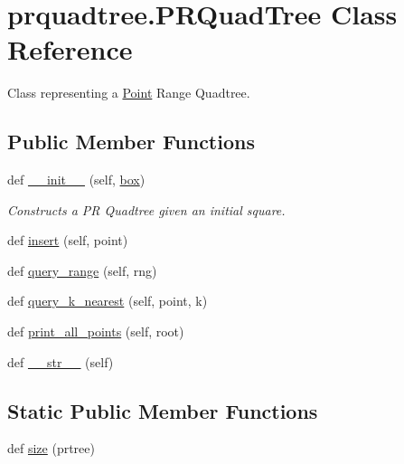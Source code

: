 \section{prquadtree.\+P\+R\+Quad\+Tree Class Reference}
\label{classprquadtree_1_1PRQuadTree}


Class representing a \hyperlink{classprquadtree_1_1Point}{Point} Range Quadtree.  


\subsection*{Public Member Functions}
\begin{DoxyCompactItemize}
\item 
def \hyperlink{classprquadtree_1_1PRQuadTree_a56de30271f808d21281b790a19448aab}{\+\_\+\+\_\+init\+\_\+\+\_\+} (self, \hyperlink{classprquadtree_1_1PRQuadTree_a2f1d8e21568aa0467a7dabedb50e3593}{box})
\begin{DoxyCompactList}\small\item\em Constructs a P\+R Quadtree given an initial square. \end{DoxyCompactList}\item 
def \hyperlink{classprquadtree_1_1PRQuadTree_ab9ca8c1d94c56c72f47dabd2f90b7754}{insert} (self, point)
\item 
def \hyperlink{classprquadtree_1_1PRQuadTree_ab145cd20b246f04ddcd53ae9618b5479}{query\+\_\+range} (self, rng)
\item 
def \hyperlink{classprquadtree_1_1PRQuadTree_a578891ac618a6770184fc1c02f426b45}{query\+\_\+k\+\_\+nearest} (self, point, k)
\item 
def \hyperlink{classprquadtree_1_1PRQuadTree_a0d43d9d2ebe765b6690067c1d8bc5a8a}{print\+\_\+all\+\_\+points} (self, root)
\item 
def \hyperlink{classprquadtree_1_1PRQuadTree_a2f9dd431836575327c97cd3fb5426adb}{\+\_\+\+\_\+str\+\_\+\+\_\+} (self)
\end{DoxyCompactItemize}
\subsection*{Static Public Member Functions}
\begin{DoxyCompactItemize}
\item 
def \hyperlink{classprquadtree_1_1PRQuadTree_a5dd006b80f1697585a10722fba06e9ba}{size} (prtree)
\end{DoxyCompactItemize}
